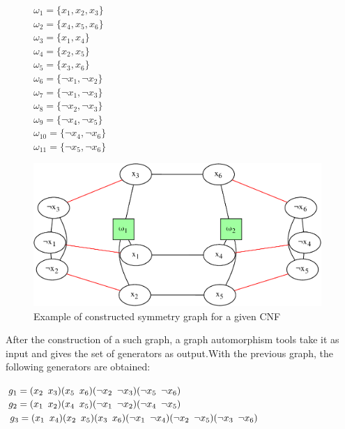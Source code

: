 \begin{figure}[!htbp]
	\begin{minipage}[r]{.2\textwidth}
			$\omega_{1} = \{ x_{1}, x_{2}, x_{3} \}$ \\
	$\omega_{2} = \{ x_{4}, x_{5}, x_{6} \}$ \\
	$\omega_{3} = \{ x_{1}, x_{4} \}$ \\
	$\omega_{4} = \{ x_{2}, x_{5} \}$ \\
	$\omega_{5} = \{ x_{3}, x_{6} \}$ \\
	$\omega_{6} = \{ \neg x_{1}, \neg x_{2} \}$ \\
	$\omega_{7} = \{ \neg x_{1}, \neg x_{3} \}$ \\
	$\omega_{8} = \{ \neg x_{2}, \neg x_{3} \}$ \\
	$\omega_{9} = \{ \neg x_{4}, \neg x_{5} \}$ \\
	$\omega_{10} = \{ \neg x_{4}, \neg x_{6} \}$ \\
	$\omega_{11} = \{ \neg x_{5}, \neg x_{6} \}$ \\
	\end{minipage}
	\begin{minipage}[r]{.75\textwidth}
		\includegraphics[width=4.3in]{cnfs/graph_cnf_opt-crop}
	\end{minipage}
	\caption{Example of constructed symmetry graph for a given CNF}
	 \label{fig:graph_opt}
\end{figure}




After the construction of a such graph, a graph automorphism tools take it as input and gives
the set of generators as output.With the previous graph, the following generators are obtained:




\begin{center}
	\begin{minipage}[c]{.635\textwidth}
		$g_1 = (x_2 \enskip x_3)(x_5 \enskip x_6)(\neg x_2 \enskip \neg x_3)(\neg x_5 \enskip \neg x_6)$\\
		$g_2 = (x_1 \enskip x_2)(x_4 \enskip x_5)(\neg x_1 \enskip \neg x_2)(\neg x_4 \enskip \neg x_5)$\\
		$g_3 = (x_1 \enskip x_4)(x_2 \enskip x_5)(x_3 \enskip x_6)(\neg x_1 \enskip \neg x_4)(\neg x_2 \enskip \neg x_5)(\neg x_3 \enskip \neg x_6)$
	\end{minipage}
\end{center}



